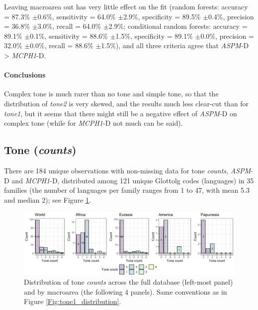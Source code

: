 \documentclass[twoside,onecolumn]{article}
\begin{document}
Leaving macroarea out has very little effect on the fit (random forests: accuracy = 87.3\% $\pm$0.6\%, sensitivity = 64.0\% $\pm$2.9\%, specificity = 89.5\% $\pm$0.4\%, precision = 36.8\% $\pm$3.0\%, recall = 64.0\% $\pm$2.9\%; conditional random forests: accuracy = 89.1\% $\pm$0.1\%, sensitivity = 88.6\% $\pm$1.5\%, specificity = 89.1\% $\pm$0.0\%, precision = 32.0\% $\pm$0.0\%, recall = 88.6\% $\pm$1.5\%), and all three criteria agree that \textit{ASPM}-D > \textit{MCPH1}-D.


\paragraph{Conclusions}

Complex tone is much rarer than no tone and simple tone, so that the distribution of \textit{tone2} is very skewed, and the results much less clear-cut than for \textit{tone1}, but it seems that there might still be a negative effect of \textit{ASPM}-D on complex tone (while for \textit{MCPH1}-D not much can be said).




\subsection{Tone (\textit{counts})}

There are 184 unique observations with non-missing data for tone \textit{counts}, \textit{ASPM}-D and \textit{MCPH1}-D, distributed among 121 unique Glottolg codes (languages) in 35 families (the number of languages per family ranges from 1 to 47, with mean 5.3 and median 2); see Figure \ref{Fig:tone_counts_distribution}.

\begin{figure}[h]
  \centering
  \includegraphics[width=\textwidth]{../../code/figures/tone_counts_distribution}
  \caption{Distribution of tone \textit{counts} across the full database (left-most panel) and by macroarea (the following 4 panels). Same conventions as in Figure \ref{Fig:tone1_distribution}.}
  \label{Fig:tone_counts_distribution}
\end{figure}
\end{document}
